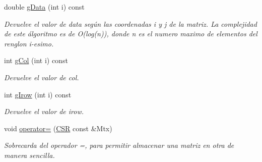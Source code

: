 \begin{DoxyCompactItemize}
double \hyperlink{class_c_s_r_a5cce7eedb969cd75345adf06e448bd64}{g\+Data} (int i) const
\begin{DoxyCompactList}\small\item\em Devuelve el valor de data según las coordenadas i y j de la matriz. La complejidad de este álgoritmo es de O(log(n)), donde n es el numero maximo de elementos del renglon i-\/esimo. \end{DoxyCompactList}\item 
int \hyperlink{class_c_s_r_a5056fbfaf6281aa5c724800ee57b2fe7}{g\+Col} (int i) const
\begin{DoxyCompactList}\small\item\em Devuelve el valor de col. \end{DoxyCompactList}\item 
int \hyperlink{class_c_s_r_ae340935fa14b4c13e8a25ab490853ba7}{g\+Irow} (int i) const
\begin{DoxyCompactList}\small\item\em Devuelve el valor de irow. \end{DoxyCompactList}\item 
void \hyperlink{class_c_s_r_a8fafaf968b8989033f26038f1ea3b444}{operator=} (\hyperlink{class_c_s_r}{C\+SR} const \&Mtx)
\begin{DoxyCompactList}\small\item\em Sobrecarda del operador =, para permitir almacenar una matriz en otra de manera sencilla. \end{DoxyCompactList}\end{DoxyCompactItemize}
